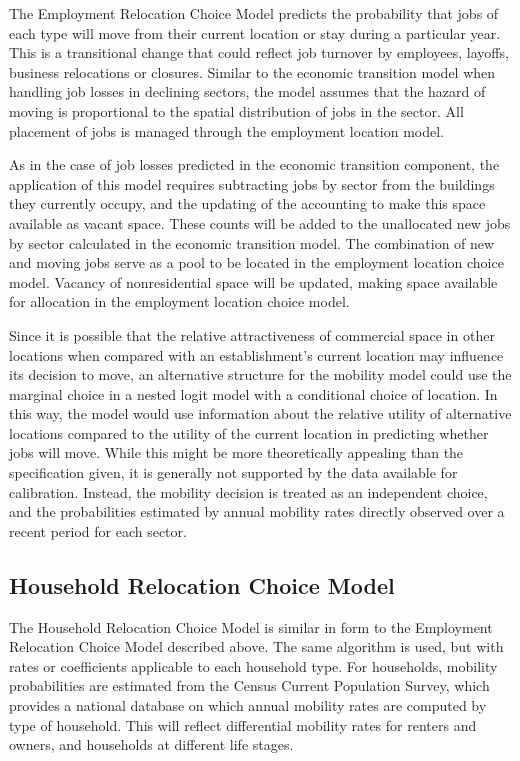 The Employment Relocation Choice Model predicts the probability that jobs
of each type will move from their current location or stay during
a particular year. This is a transitional change that could
reflect job turnover by employees, layoffs, business relocations
or closures. Similar to the economic transition model when
handling job losses in declining sectors, the model assumes that
the hazard of moving is proportional to the spatial distribution
of jobs in the sector.  All placement of jobs is managed through
the employment location model.

As in the case of job losses predicted in the economic transition
component, the application of this model requires subtracting jobs
by sector from the buildings they currently occupy, and the
updating of the accounting to make this space available as vacant
space. These counts will be added to the unallocated new jobs by
sector calculated in the economic transition model. The
combination of new and moving jobs serve as a pool to be located
in the employment location choice model. Vacancy of nonresidential
space will be updated, making space available for allocation in
the employment location choice model.

Since it is possible that the relative attractiveness of
commercial space in other locations when compared with an
establishment's current location may influence its decision to
move, an alternative structure for the mobility model could use
the marginal choice in a nested logit model with a conditional
choice of location. In this way, the model would use information
about the relative utility of alternative locations compared to
the utility of the current location in predicting whether jobs
will move.  While this might be more theoretically appealing than
the specification given, it is generally not supported by the data
available for calibration. Instead, the mobility decision is
treated as an independent choice, and the probabilities estimated
by annual mobility rates directly observed over a recent period
for each sector.


\subsection{Household Relocation Choice Model}

The Household Relocation Choice Model is similar in form to the Employment
Relocation Choice Model described above.  The same algorithm is used, but
with rates or coefficients applicable to each household type.  For
households, mobility probabilities are estimated from the Census
Current Population Survey, which provides a national database on
which annual mobility rates are computed by type of household.
This will reflect differential mobility rates for renters and
owners, and households at different life stages.

